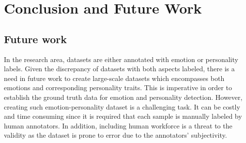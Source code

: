 \chapter{Conclusion and Future Work}

\section{Future work}
In the research area, datasets are either annotated with emotion or personality labels. Given the discrepancy of datasets with both aspects labeled, there is a need in future work to create large-scale datasets which encompasses both emotions and corresponding personality traits. This is imperative in order to establish the ground truth data for emotion and personality detection. However, creating such emotion-personality dataset is a challenging task. It can be costly and time consuming since it is required that each sample is manually labeled by human annotators. In addition, including human workforce is a threat to the validity as the dataset is prone to error due to the annotators' subjectivity. 

